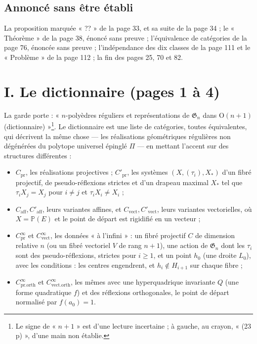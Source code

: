 \documentclass[11pt,a4paper]{article}
\begin{document}
\subsection*{Annoncé sans être établi}

La proposition marquée « ?? » de la page 33, et sa suite de la page 34 ; le
« Théorème » de la page 38, énoncé sans preuve ; l'équivalence de catégories de
la page 76, énoncée sans preuve ; l'indépendance des dix classes de la page 111
et le « Problème » de la page 112 ; la fin des pages 25, 70 et 82.

\section*{I. Le dictionnaire (pages 1 à 4)}

La garde porte : « $n$-polyèdres réguliers et représentations de
$\mathfrak{G}_n$ dans $\mathrm{O}(n+1)$ (dictionnaire) »\footnote{Le signe
de « $n+1$ » est d'une lecture incertaine ; à gauche, au crayon, « (23 p) »,
d'une main non établie.}. Le dictionnaire est une liste de catégories, toutes
équivalentes, qui décrivent la même chose --- les réalisations géométriques
régulières non dégénérées du polytope universel épinglé $\Pi$ --- en mettant
l'accent sur des structures différentes :
\begin{itemize}
  \item $C_{\mathrm{pr}}$, les réalisations projectives ; $C'_{\mathrm{pr}}$,
    les systèmes $(X, (\tau_i), X_*)$ d'un fibré projectif, de
    pseudo-réflexions strictes et d'un drapeau maximal $X_*$ tel que $\tau_i
    X_j = X_j$ pour $i \neq j$ et $\tau_i X_i \neq X_i$ ;
  \item $C_{\mathrm{aff}}, C'_{\mathrm{aff}}$, leurs variantes affines, et
    $C_{\mathrm{vect}}, C'_{\mathrm{vect}}$, leurs variantes vectorielles, où
    $X = \mathbb{P}(E)$ et le point de départ est rigidifié en un vecteur ;
  \item $C^\infty_{\mathrm{pr}}$ et $C^\infty_{\mathrm{vect}}$, les données
    « à l'infini » : un fibré projectif $C$ de dimension relative $n$ (ou un
    fibré vectoriel $V$ de rang $n+1$), une action de $\mathfrak{G}_n$ dont
    les $\tau_i$ sont des pseudo-réflexions, strictes pour $i \geqslant 1$,
    et un point $h_0$ (une droite $L_0$), avec les conditions : les centres
    engendrent, et $h_i \notin H_{i+1}$ sur chaque fibre ;
  \item $C^\infty_{\mathrm{pr.orth}}$ et $C^\infty_{\mathrm{vect.orth}}$, les
    mêmes avec une hyperquadrique invariante $Q$ (une forme quadratique $f$)
    et des réflexions orthogonales, le point de départ normalisé par $f(a_0)
    = 1$.
\end{itemize}
\end{document}

